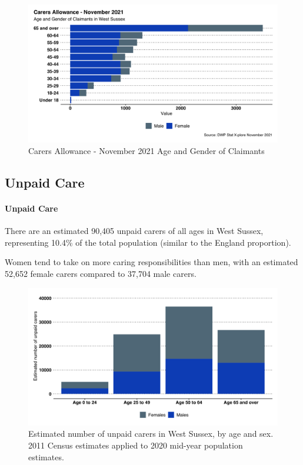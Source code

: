 \begin{figure}[h]
    \caption{Carers Allowance - November 2021 Age and Gender of Claimants}\label{fig:carer-claims-age-gender}
    \centering
    \includegraphics[width=\linewidth]{images/carers_allowance_recipients.png}
\end{figure}


\subsection{Unpaid Care}
\paragraph{Unpaid Care}There are an estimated 90,405 unpaid carers of all ages in West Sussex, representing 10.4\% of the total population (similar to the England proportion).

Women tend to take on more caring responsibilities than men, with an estimated 52,652 female carers compared to 37,704 male carers.

\begin{figure}[h]
    \caption{Estimated number of unpaid carers in West Sussex, by age and sex. 2011 Census estimates applied to 2020 mid-year population estimates.}\label{fig:unpaid-carers-sex-age}
    \centering
    \includegraphics[width=\linewidth]{images/wsx_unpaid_carers_by_age.png}
\end{figure}

